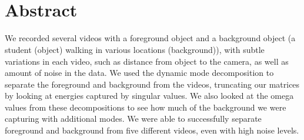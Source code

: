 \documentclass{article}
\title{
    \textmd{\textbf{\text{ } \hmwkTitle}}\\
}
\author{\hmwkAuthorName}
\date{}
\begin{document}
\maketitle

\section*{\fontsize{19}{15}\selectfont Abstract}
		We recorded several videos with a foreground object and a background object (a student (object) walking in various locations (background)), with subtle variations in each video, such as distance from object to the camera, as well as amount of noise in the data. We used the dynamic mode decomposition to separate the foreground and background from the videos, truncating our matrices by looking at energies captured by singular values. We also looked at the omega values from these decompositions to see how much of the background we were capturing with additional modes. We were able to successfully separate foreground and background from five different videos, even with high noise levels.
\end{document}
